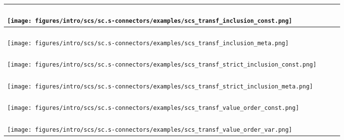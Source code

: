 \begin{SCn}
{\begin{longtable}[l]{|m{6.2cm}|m{2.5cm}|m{2.5cm}|m{2.5cm}|m{2.5cm}|}
	\parbox[c]{6.2cm}{\\\centering\texttt{[image: figures/intro/scs/sc.s-connectors/examples/scs\_transf\_inclusion\_const.png]}\\} & \parbox[c]{2.5cm}{\centering\supseteq} & \parbox[c]{2.5cm}{\centering\subseteq} &  \\
	\hline
	
	\parbox[c]{6.2cm}{\\\centering\texttt{[image: figures/intro/scs/sc.s-connectors/examples/scs\_transf\_inclusion\_meta.png]}\\} & \parbox[c]{2.5cm}{\centering\textunderscore\supseteq} & \parbox[c]{2.5cm}{\centering\subseteq\textunderscore} &  \\
	\hline
	
	\parbox[c]{6.2cm}{\\\centering\texttt{[image: figures/intro/scs/sc.s-connectors/examples/scs\_transf\_strict\_inclusion\_const.png]}\\} & \parbox[c]{2.5cm}{\centering\supset} & \parbox[c]{2.5cm}{\centering\subset} &  \\
	\hline
	
	\parbox[c]{6.2cm}{\\\centering\texttt{[image: figures/intro/scs/sc.s-connectors/examples/scs\_transf\_strict\_inclusion\_meta.png]}\\} & \parbox[c]{2.5cm}{\centering\textunderscore\supset} & \parbox[c]{2.5cm}{\centering\subset\textunderscore} &  \\
	\hline
	
	\parbox[c]{6.2cm}{\\\centering\texttt{[image: figures/intro/scs/sc.s-connectors/examples/scs\_transf\_value\_order\_const.png]}\\} & \parbox[c]{2.5cm}{\centering\geq} & \parbox[c]{2.5cm}{\centering\leq} &  \\
	\hline
	
	\parbox[c]{6.2cm}{\\\centering\texttt{[image: figures/intro/scs/sc.s-connectors/examples/scs\_transf\_value\_order\_var.png]}\\} & \parbox[c]{2.5cm}{\centering\textunderscore\geq} & \parbox[c]{2.5cm}{\centering\textunderscore\leq} &   \\
	\hline
	

\end{longtable}}
\end{SCn}
